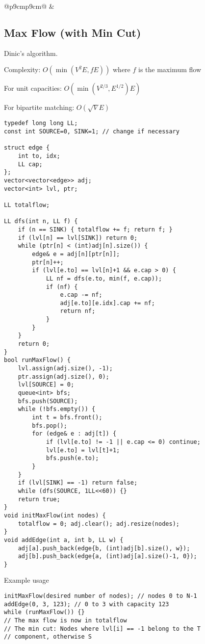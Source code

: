 \documentclass[letterpaper]{article}
\begin{document}
\begin{tabular}{@{}p{9cm}p{9cm}@{}}
&
\subsection{Max Flow (with Min Cut)}

Dinic's algorithm.

Complexity: $O\left(\min\left(V^2E, fE\right)\right)$ where $f$ is the maximum flow

For unit capacities: $O\left(\min\left(V^{2/3}, E^{1/2}\right)E\right)$

For bipartite matching: $O\left(\sqrt VE\right)$

\begin{lstlisting}
typedef long long LL;
const int SOURCE=0, SINK=1; // change if necessary

struct edge {
	int to, idx;
	LL cap;
};
vector<vector<edge>> adj;
vector<int> lvl, ptr;

LL totalflow;

LL dfs(int n, LL f) {
	if (n == SINK) { totalflow += f; return f; }
	if (lvl[n] == lvl[SINK]) return 0;
	while (ptr[n] < (int)adj[n].size()) {
		edge& e = adj[n][ptr[n]];
		ptr[n]++;
		if (lvl[e.to] == lvl[n]+1 && e.cap > 0) {
			LL nf = dfs(e.to, min(f, e.cap));
			if (nf) {
				e.cap -= nf;
				adj[e.to][e.idx].cap += nf;
				return nf;
			}
		}
	}
	return 0;
}
bool runMaxFlow() {
	lvl.assign(adj.size(), -1);
	ptr.assign(adj.size(), 0);
	lvl[SOURCE] = 0;
	queue<int> bfs;
	bfs.push(SOURCE);
	while (!bfs.empty()) {
		int t = bfs.front();
		bfs.pop();
		for (edge& e : adj[t]) {
			if (lvl[e.to] != -1 || e.cap <= 0) continue;
			lvl[e.to] = lvl[t]+1;
			bfs.push(e.to);
		}
	}
	if (lvl[SINK] == -1) return false;
	while (dfs(SOURCE, 1LL<<60)) {}
	return true;
}
void initMaxFlow(int nodes) {
	totalflow = 0; adj.clear(); adj.resize(nodes);
}
void addEdge(int a, int b, LL w) {
	adj[a].push_back(edge{b, (int)adj[b].size(), w});
	adj[b].push_back(edge{a, (int)adj[a].size()-1, 0});
}
\end{lstlisting}
Example usage
\begin{lstlisting}
initMaxFlow(desired number of nodes); // nodes 0 to N-1
addEdge(0, 3, 123); // 0 to 3 with capacity 123
while (runMaxFlow()) {}
// The max flow is now in totalflow
// The min cut: Nodes where lvl[i] == -1 belong to the T
// component, otherwise S
\end{lstlisting}
\end{tabular}

\clearpage
\end{document}
